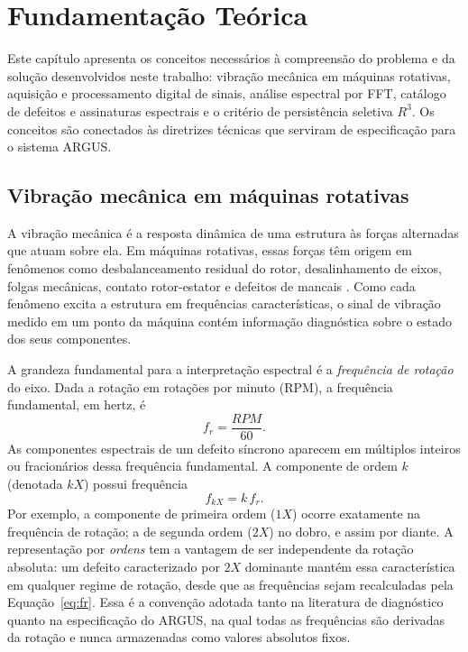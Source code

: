 \chapter{Fundamentação Teórica}
\label{cap:fundamentacao}

Este capítulo apresenta os conceitos necessários à compreensão do problema e
da solução desenvolvidos neste trabalho: vibração mecânica em máquinas
rotativas, aquisição e processamento digital de sinais, análise espectral por
FFT, catálogo de defeitos e assinaturas espectrais e o critério de
persistência seletiva \(R^3\). Os conceitos são conectados às diretrizes
técnicas que serviram de especificação para o sistema ARGUS.

\section{Vibração mecânica em máquinas rotativas}

A vibração mecânica é a resposta dinâmica de uma estrutura às forças
alternadas que atuam sobre ela. Em máquinas rotativas, essas forças têm origem
em fenômenos como desbalanceamento residual do rotor, desalinhamento de
eixos, folgas mecânicas, contato rotor-estator e defeitos de mancais
\cite{harris2002,randall2011}. Como cada fenômeno excita a estrutura em
frequências características, o sinal de vibração medido em um ponto da máquina
contém informação diagnóstica sobre o estado dos seus componentes.

A grandeza fundamental para a interpretação espectral é a \emph{frequência de
rotação} do eixo. Dada a rotação em rotações por minuto (RPM), a frequência
fundamental, em hertz, é
\begin{equation}
\label{eq:fr}
  f_r = \frac{RPM}{60}.
\end{equation}
As componentes espectrais de um defeito síncrono aparecem em múltiplos
inteiros ou fracionários dessa frequência fundamental. A componente de ordem
\(k\) (denotada \(kX\)) possui frequência
\begin{equation}
\label{eq:fk}
  f_{kX} = k\, f_r .
\end{equation}
Por exemplo, a componente de primeira ordem (\(1X\)) ocorre exatamente na
frequência de rotação; a de segunda ordem (\(2X\)) no dobro, e assim por
diante. A representação por \emph{ordens} tem a vantagem de ser independente
da rotação absoluta: um defeito caracterizado por \(2X\) dominante mantém essa
característica em qualquer regime de rotação, desde que as frequências sejam
recalculadas pela Equação~\eqref{eq:fr}. Essa é a convenção adotada tanto na
literatura de diagnóstico quanto na especificação do ARGUS, na qual todas as
frequências são derivadas da rotação e nunca armazenadas como valores
absolutos fixos.

